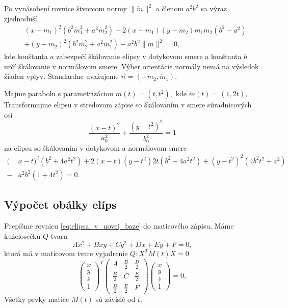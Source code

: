 Po vynásobení rovnice štvorcom normy $\| \dot{m}\|^2$ a členom $a^2b^2$ sa výraz zjednoduší
\begin{align*}
&(x-m_1)^2(b^2 \dot{m}_1^2 + a^2 \dot{m}_2^2) + 2(x-m_1)(y-m_2)\dot{m}_1\dot{m}_2(b^2-a^2) \\
&+(y-m_2)^2(b^2 \dot{m}_2^2 + a^2 \dot{m}_1^2) - a^2 b^2 \| \dot{m}\|^2 = 0,
\end{align*}
kde konštanta $a$ zabezpečí škálovanie elipsy v dotykovom smere a konštanta $b$ určí škálovanie v normálovom smere. Výber orientácie normály nemá na výsledok žiaden vplyv. Štandardne uvažujeme $\vec{n}=(-\dot{m}_2, \dot{m}_1).$

\begin{example}[Parabola]
Majme parabolu s parametrizáciou $m(t)=(t, t^2), $ kde $\dot{m}(t)=(1, 2t),$ Transformujme elipsu v stredovom zápise so škálovaním v smere súradnicových osí
\begin{equation*}
\frac{(x - t)^2}{a_0^2} + \frac{(y - t^2)^2}{b_0^2} = 1
\end{equation*}
na elipsu so škálovaním v dotykovom a normálovom smere
\begin{align*}
(&x-t)^2(b^2 + 4a^2t^2) + 2(x-t)(y-t^2)2t(b^2-4a^2t^2)+(y-t^2)^2(4b^2t^2 + a^2) \\
 - &a^2b^2(1+4t^2) = 0.
\end{align*} 
\end{example}

\subsection{Výpočet obálky elíps}
Prepíšme rovnicu \ref{eq:elipsa_v_novej_baze} do maticového zápisu. Máme kužeľosečku $Q$ tvaru $$
Ax^2 + Bxy + Cy^2 + Dx + Ey + F = 0,$$
ktorá má v maticovom tvare vyjadrenie $Q: X^TM(t)X = 0$
$$
\left(\begin{matrix} x \\ y \\ z  \\ 1
\end{matrix} \right)^T \left(\begin{matrix} 
A & \frac{B}{2} & \frac{D}{2} \\
\frac{B}{2} & C & \frac{E}{2} \\
\frac{D}{2} & \frac{E}{2} & F 
\end{matrix} \right)\left(\begin{matrix} x \\ y \\ z \\ 1
\end{matrix} \right) = 0,
$$ 
Všetky prvky matice $M(t)$ sú závislé od $t$.

